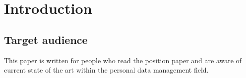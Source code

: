 \documentclass{article}
\begin{document}





\begin{abstract}

\end{abstract}

\tableofcontents

%  
%  
%  

\section{Introduction}
\subsection{Target audience}
This paper is written for people who read the position paper and are aware of current state of the art within the personal data management field.
\end{document}
